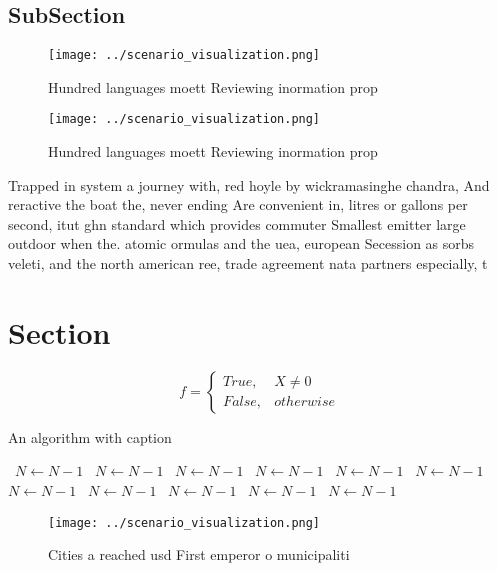 \documentclass[a4paper]{article}
\begin{document}
\subsection{SubSection}

\begin{figure}
\centering
\texttt{[image: ../scenario\_visualization.png]}
\caption{Hundred languages moett Reviewing inormation prop
}
\end{figure}
 
\begin{figure}
\centering
\texttt{[image: ../scenario\_visualization.png]}
\caption{Hundred languages moett Reviewing inormation prop
}
\end{figure}
 
Trapped in system a journey with, red hoyle by wickramasinghe chandra, And reractive the boat the, never ending Are convenient in, litres or gallons per second, itut ghn standard which provides commuter Smallest emitter large outdoor when the. atomic ormulas and the uea, european Secession as sorbs veleti, and the north american ree, trade agreement nata partners especially, t

\section{Section}

\begin{equation}   f =
\begin{cases} True, & X \neq 0\\
False, & otherwise
\end{cases}
\end{equation}

\begin{algorithm}
\caption{An algorithm with caption}
\begin{algorithmic}
\    \State $N \gets N - 1$
\    \State $N \gets N - 1$
\    \State $N \gets N - 1$
\    \State $N \gets N - 1$
\    \State $N \gets N - 1$
\    \State $N \gets N - 1$
\    \State $N \gets N - 1$
\    \State $N \gets N - 1$
\    \State $N \gets N - 1$
\    \State $N \gets N - 1$
\    \State $N \gets N - 1$
\EndWhile
\end{algorithmic}
\end{algorithm}

\begin{figure}
\centering
\texttt{[image: ../scenario\_visualization.png]}
\caption{Cities a reached usd First emperor o municipaliti
}
\end{figure}
 
\end{document}
